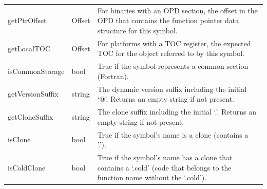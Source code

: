 \begin{tabularx}{\textwidth}{llX}
getPtrOffset & Offset & For binaries with an OPD section, the offset in the OPD that contains the function pointer data structure for this symbol. \\
getLocalTOC & Offset & For platforms with a TOC register, the expected TOC for the object referred to by this symbol. \\
isCommonStorage & bool & True if the symbol represents a common section (Fortran). \\
getVersionSuffix & string & The dynamic version suffix including the initial `@'. Returns an empty string if not present. \\
getCloneSuffix & string & The clone suffix including the initial `.'. Returns an empty string if not present. \\
isClone & bool & True if the symbol's name is a clone (contains a '.'). \\
isColdClone & bool & True if the symbol's name has a clone that contains a `.cold' (code that belongs to the function name without the `.cold'). \\
\bottomrule
\end{tabularx}


